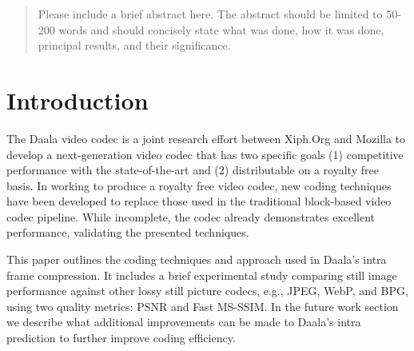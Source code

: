 \documentclass[conference, 10pt]{IEEEtran}
\begin{document}




\maketitle


\begin{abstract}
Please include a brief abstract here. The abstract should be limited to 50-200 words and should concisely state what was done, how it was done, principal results, and their significance.
\end{abstract}





%
\IEEEpeerreviewmaketitle



\section{Introduction}
The Daala video codec is a joint research effort between Xiph.Org and Mozilla
 to develop a next-generation video codec that has two specific goals (1)
 competitive performance with the state-of-the-art and (2) distributable on
 a royalty free basis.
In working to produce a royalty free video codec, new coding techniques have
 been developed to replace those used in the traditional block-based video
 codec pipeline.
While incomplete, the codec already demonstrates excellent performance,
 validating the presented techniques.

This paper outlines the coding techniques and approach used in Daala's intra
 frame compression.
It includes a brief experimental study comparing still image performance
 against other lossy still picture codecs, e.g., JPEG, WebP, and BPG, using
 two quality metrics: PSNR and Fast MS-SSIM\cite{Chen2010}.
In the future work section we describe what additional improvements can be made
 to Daala's intra prediction to further improve coding efficiency.
\end{document}
